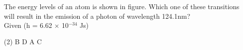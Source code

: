 \item The energy levels of an atom is shown in figure. Which one of these transitions will result in the emission of a photon of wavelength 124.1nm? \\
        Given (h = 6.62 $\times$ 10$^{-34}$ Js)
        \begin{center}
        \end{center}
        \begin{tasks}(2)
            \task B
            \task D
            \task A
            \task C
        \end{tasks}